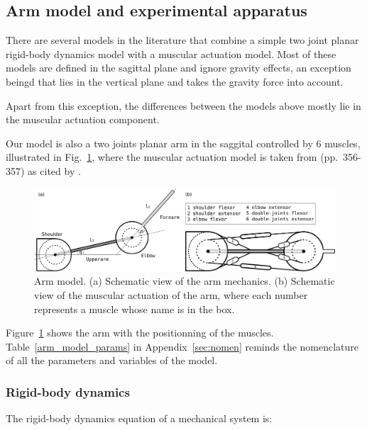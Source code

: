 \documentclass[10pt]{article}
\begin{document}
\subsection{Arm model and experimental apparatus}
\label{sec:setup}

There are several models in the literature that combine a simple two joint planar rigid-body dynamics model with a muscular actuation model. Most of these models \cite{katayama93,mitrovic08_SAB,li2006} are defined in the sagittal plane and
ignore gravity effects, an exception beingd \cite{Kambara2009} that lies in the vertical plane and takes the gravity force into account.

Apart from this exception, the differences between the models above mostly lie in the muscular actuation component.

Our model is also a two joints planar arm in the saggital controlled by 6 muscles, illustrated in Fig.~\ref{fig:arm_model}, where the muscular actuation model is taken from \cite{katayama93} (pp.~356-357) as cited by \cite{mitrovic08_SAB}.

\begin{figure}[hbt]
\centering
	\includegraphics[width=0.9\columnwidth]{images/arm_model_horiz}
	\caption{Arm model. (a) Schematic view of the arm mechanics. (b) Schematic view of the muscular actuation of the arm, where each number represents a muscle whose name is in the box.}
	\label{fig:arm_model}
\end{figure}

Figure~\ref{fig:arm_model} shows the arm with the positionning of the muscles.
Table~\ref{arm_model_params} in Appendix~\ref{sec:nomen} reminds the nomenclature of all the parameters and variables of the model. 

\subsubsection{Rigid-body dynamics}
\label{sec:arm_dynamics}

The rigid-body dynamics equation of a mechanical system is:
\end{document}
